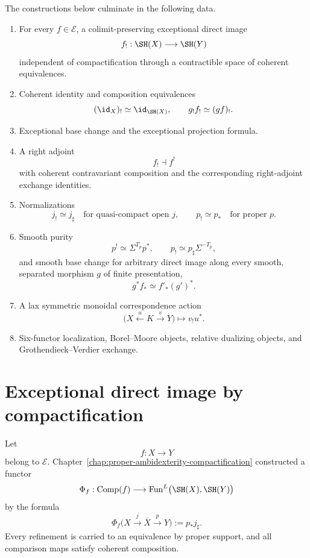 The constructions below culminate in the following data.
\begin{enumerate}
    \item For every \(f\in\mathcal E\), a colimit-preserving exceptional
    direct image
    \[
        f_!:\SH(X)\longrightarrow\SH(Y)
    \]
    independent of compactification through a contractible space of
    coherent equivalences.

    \item Coherent identity and composition equivalences
    \[
        (\id_X)_!\simeq\id_{\SH(X)},
        \qquad
        g_!f_!\simeq(gf)_!.
    \]

    \item Exceptional base change and the exceptional projection formula.

    \item A right adjoint
    \[
        f_!\dashv f^!
    \]
    with coherent contravariant composition and the corresponding
    right-adjoint exchange identities.

    \item Normalizations
    \[
        j_!\simeq j_\sharp
        \quad\text{for quasi-compact open }j,
        \qquad
        p_!\simeq p_*
        \quad\text{for proper }p.
    \]

    \item Smooth purity
    \[
        p^!\simeq\Sigma^{T_p}p^*,
        \qquad
        p_!\simeq p_\sharp\Sigma^{-T_p},
    \]
    and smooth base change for arbitrary direct image along every smooth,
    separated morphism \(g\) of finite presentation,
    \[
        g^*f_*
        \simeq
        f'_*(g')^*.
    \]

    \item A lax symmetric monoidal correspondence action
    \[
        \bigl(X\xleftarrow{u}K\xrightarrow{v}Y\bigr)
        \longmapsto
        v_!u^*.
    \]

    \item Six-functor localization, Borel--Moore objects, relative
    dualizing objects, and Grothendieck--Verdier exchange.
\end{enumerate}

\section{Exceptional direct image by compactification}
\label{sec:exceptional-direct-image}

Let
\[
    f:X\longrightarrow Y
\]
belong to \(\mathcal E\).  Chapter~\ref{chap:proper-ambidexterity-compactification}
constructed a functor
\[
    \Phi_f:
    \operatorname{Comp}(f)
    \longrightarrow
    \operatorname{Fun}^L
    \bigl(
      \SH(X),
      \SH(Y)
    \bigr)
\]
by the formula
\[
    \Phi_f
    \bigl(
      X\xrightarrow{j}\overline X\xrightarrow{p}Y
    \bigr)
    :=
    p_*j_\sharp.
\]
Every refinement is carried to an equivalence by proper support, and all
comparison maps satisfy coherent composition.

